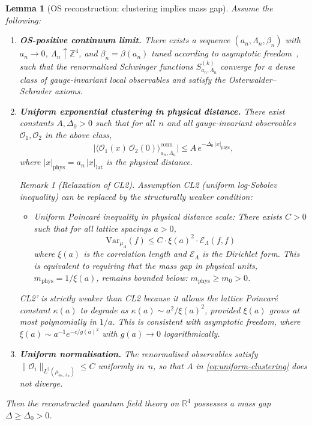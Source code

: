 \documentclass[12pt,a4paper]{article}
\theoremstyle{definition}
\theoremstyle{plain}
\newtheorem{lemma}[definition]{Lemma}
\theoremstyle{remark}
\newtheorem{remark}[definition]{Remark}
\begin{document}
\begin{lemma}[OS reconstruction: clustering implies mass gap]
\label{thm:continuum-gap}
Assume the following:
\begin{enumerate}
    \item[\textup{(CL1)}] \textbf{OS-positive continuum limit.}  There exists a sequence $(a_n, \Lambda_n, \beta_n)$ with $a_n \to 0$, $\Lambda_n \uparrow \mathbb{Z}^4$, and $\beta_n = \beta(a_n)$ tuned according to asymptotic freedom~\cite{GrossWilczek1973,Politzer1973}, such that the renormalized Schwinger functions $S^{(k)}_{a_n,\Lambda_n}$ converge for a dense class of gauge-invariant local observables and satisfy the Osterwalder--Schrader axioms.
    \item[\textup{(CL2)}] \textbf{Uniform exponential clustering in physical distance.}  There exist constants $A, \Delta_0 > 0$ such that for all~$n$ and all gauge-invariant observables $\mathcal{O}_1, \mathcal{O}_2$ in the above class,
    \begin{equation}\label{eq:uniform-clustering}
        \bigl|\langle \mathcal{O}_1(x)\,\mathcal{O}_2(0)\rangle_{a_n,\Lambda_n}^{\mathrm{conn}}\bigr|
        \leq A\,e^{-\Delta_0\,|x|_{\mathrm{phys}}},
    \end{equation}
    where $|x|_{\mathrm{phys}} = a_n\,|x|_{\mathrm{lat}}$ is the physical distance.

\begin{remark}[Relaxation of CL2]
\label{rem:cl2-relaxation}
Assumption CL2 (uniform log-Sobolev inequality) can be replaced by the structurally weaker condition:
\begin{itemize}
\item[\textbf{CL2'.}] \emph{Uniform Poincar\'e inequality in physical distance scale:} There exists $C > 0$ such that for all lattice spacings $a > 0$,
\[
\mathrm{Var}_{\mu_\Lambda}(f) \leq C \cdot \xi(a)^2 \cdot \mathcal{E}_\Lambda(f, f)
\]
where $\xi(a)$ is the correlation length and $\mathcal{E}_\Lambda$ is the Dirichlet form. This is equivalent to requiring that the mass gap in physical units, $m_{\mathrm{phys}} = 1/\xi(a)$, remains bounded below: $m_{\mathrm{phys}} \geq m_0 > 0$.
\end{itemize}
CL2' is strictly weaker than CL2 because it allows the lattice Poincar\'e constant $\kappa(a)$ to degrade as $\kappa(a) \sim a^2/\xi(a)^2$, provided $\xi(a)$ grows at most polynomially in $1/a$. This is consistent with asymptotic freedom, where $\xi(a) \sim a^{-1} e^{-c/g(a)^2}$ with $g(a) \to 0$ logarithmically.
\end{remark}

    \item[\textup{(CL3)}] \textbf{Uniform normalisation.}  The renormalised observables satisfy $\|\mathcal{O}_i\|_{L^2(\mu_{a_n,\Lambda_n})} \leq C$ uniformly in~$n$, so that $A$ in \eqref{eq:uniform-clustering} does not diverge.
\end{enumerate}
Then the reconstructed quantum field theory on $\mathbb{R}^4$ possesses a mass gap $\Delta \geq \Delta_0 > 0$.
\end{lemma}
\end{document}
